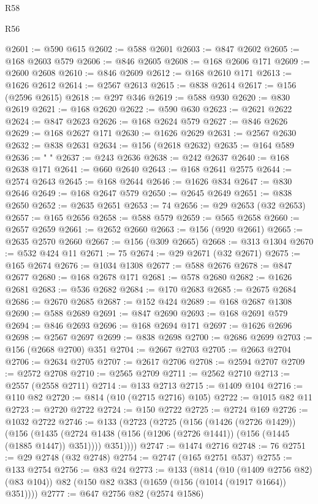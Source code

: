 \begin{lexlean}{R58}
\begin{lexlean}{R56}
\begin{coremodule}
{{{{{{{{{{{{{{{{{{{{{{{{{{{{{{{{{{{{{{{{{{{{{{{{{{{{{{{{{{{{{{{{{{{{{{{{{{{{{{{{{{{{{{{{{{{{{{{{{{{{{{{{{{{{{{{{{{{{{{{{{{{{{{{{{{{{{{{{{{{{{{{{{{{{{{{{{{{{{{{{{{{{{{{{{{{{{{{{{{{{{{{{{{{{{{{{{{{{{{{{{{{{{{{{{{{@2601 := @590 @615
@2602 := @588 @2601
@2603 := @847 @2602
@2605 := @168 @2603 @579
@2606 := @846 @2605
@2608 := @168 @2606 @171
@2609 := @2600 @2608
@2610 := @846 @2609
@2612 := @168 @2610 @171
@2613 := @1626 @2612
@2614 := @2567 @2613
@2615 := @838 @2614
@2617 := @156 (@2596 @2615)
@2618 := @297 @346
@2619 := @588 @930
@2620 := @830 @2619
@2621 := @168 @2620
@2622 := @590 @630
@2623 := @2621 @2622
@2624 := @847 @2623
@2626 := @168 @2624 @579
@2627 := @846 @2626
@2629 := @168 @2627 @171
@2630 := @1626 @2629
@2631 := @2567 @2630
@2632 := @838 @2631
@2634 := @156 (@2618 @2632)
@2635 := @164 @589
@2636 := " "
@2637 := @243 @2636
@2638 := @242 @2637
@2640 := @168 @2638 @171
@2641 := @660 @2640
@2643 := @168 @2641 @2575
@2644 := @2574 @2643
@2645 := @168 @2644
@2646 := @1626 @834
@2647 := @830 @2646
@2649 := @168 @2647 @579
@2650 := @2645 @2649
@2651 := @838 @2650
@2652 := @2635 @2651
@2653 := 74
@2656 := @29 @2653 (@32 @2653)
@2657 := @165 @2656
@2658 := @588 @579
@2659 := @565 @2658
@2660 := @2657 @2659
@2661 := @2652 @2660
@2663 := @156 (@920 @2661)
@2665 := @2635 @2570 @2660
@2667 := @156 (@309 @2665)
@2668 := @313 @1304
@2670 := @532 @424 @11
@2671 := 75
@2674 := @29 @2671 (@32 @2671)
@2675 := @165 @2674
@2676 := @1034 @1308
@2677 := @588 @2676
@2678 := @847 @2677
@2680 := @168 @2678 @171
@2681 := @578 @2680
@2682 := @1626 @2681
@2683 := @536 @2682
@2684 := @170 @2683
@2685 := @2675 @2684
@2686 := @2670 @2685
@2687 := @152 @424
@2689 := @168 @2687 @1308
@2690 := @588 @2689
@2691 := @847 @2690
@2693 := @168 @2691 @579
@2694 := @846 @2693
@2696 := @168 @2694 @171
@2697 := @1626 @2696
@2698 := @2567 @2697
@2699 := @838 @2698
@2700 := @2686 @2699
@2703 := @156 (@2668 @2700) @351
@2704 := @2667 @2703
@2705 := @2663 @2704
@2706 := @2634 @2705
@2707 := @2617 @2706
@2708 := @2594 @2707
@2709 := @2572 @2708
@2710 := @2565 @2709
@2711 := @2562 @2710
@2713 := @2557 (@2558 @2711)
@2714 := @133 @2713
@2715 := @1409 @104
@2716 := @110 @82
@2720 := @814 (@10 (@2715 @2716) @105)
@2722 := @1015 @82 @11
@2723 := @2720 @2722
@2724 := @150 @2722
@2725 := @2724 @169
@2726 := @1032 @2722
@2746 := @133
    (@2723
      (@2725
        (@156
          (@1426 (@2726 @1429))
          (@156
            (@1435 (@2724 @1438 (@156 (@1206 (@2726 @1441)) (@156 (@1445 (@1885 @1447)) @351))))
            @351))))
@2747 := @1474 @2716
@2748 := 76
@2751 := @29 @2748 (@32 @2748)
@2754 := @2747 (@165 @2751 @537)
@2755 := @133 @2754
@2756 := @83 @24
@2773 := @133
    (@814
      (@10 (@1409 @2756 @82) (@83 @104))
      @82
      (@150 @82 @383 (@1659 (@156 (@1014 (@1917 @1664)) @351))))
@2777 := @647 @2756 @82 (@2574 @1586)
}}}}}}}}}}}}}}}}}}}}}}}}}}}}}}}}}}}}}}}}}}}}}}}}}}}}}}}}}}}}}}}}}}}}}}}}}}}}}}}}}}}}}}}}}}}}}}}}}}}}}}}}}}}}}}}}}}}}}}}}}}}}}}}}}}}}}}}}}}}}}}}}}}}}}}}}}}}}}}}}}}}}}}}}}}}}}}}}}}}}}}}}}}}}}}}}}}}}}}}}}}}}}}}}}}}
\end{coremodule}
\end{lexlean}
\end{lexlean}
